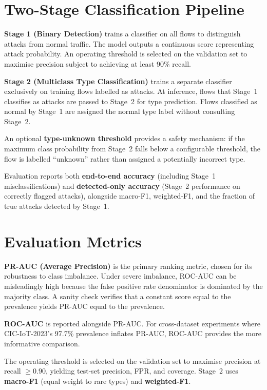 \documentclass[12pt,a4paper]{report}
\begin{document}
\section{Two-Stage Classification Pipeline}
\label{sec:two-stage}

\textbf{Stage 1 (Binary Detection)} trains a classifier on all flows to distinguish attacks from normal traffic. The model outputs a continuous score representing attack probability. An operating threshold is selected on the validation set to maximise precision subject to achieving at least 90\% recall.

\textbf{Stage 2 (Multiclass Type Classification)} trains a separate classifier exclusively on training flows labelled as attacks. At inference, flows that Stage~1 classifies as attacks are passed to Stage~2 for type prediction. Flows classified as normal by Stage~1 are assigned the normal type label without consulting Stage~2.

An optional \textbf{type-unknown threshold} provides a safety mechanism: if the maximum class probability from Stage~2 falls below a configurable threshold, the flow is labelled ``unknown'' rather than assigned a potentially incorrect type.

Evaluation reports both \textbf{end-to-end accuracy} (including Stage~1 misclassifications) and \textbf{detected-only accuracy} (Stage~2 performance on correctly flagged attacks), alongside macro-F1, weighted-F1, and the fraction of true attacks detected by Stage~1.

\section{Evaluation Metrics}
\label{sec:metrics}

\textbf{PR-AUC (Average Precision)} is the primary ranking metric, chosen for its robustness to class imbalance. Under severe imbalance, ROC-AUC can be misleadingly high because the false positive rate denominator is dominated by the majority class. A sanity check verifies that a constant score equal to the prevalence yields PR-AUC equal to the prevalence.

\textbf{ROC-AUC} is reported alongside PR-AUC. For cross-dataset experiments where CIC-IoT-2023's 97.7\% prevalence inflates PR-AUC, ROC-AUC provides the more informative comparison.

The operating threshold is selected on the validation set to maximise precision at recall $\geq 0.90$, yielding test-set precision, FPR, and coverage. Stage~2 uses \textbf{macro-F1} (equal weight to rare types) and \textbf{weighted-F1}.
\end{document}
